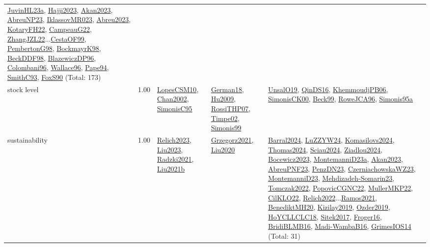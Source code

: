 {\begin{longtable}{p{3cm}r>{\raggedright\arraybackslash}p{6cm}>{\raggedright\arraybackslash}p{6cm}>{\raggedright\arraybackslash}p{8cm}}
\hyperref[detail:JuvinHL23a]{JuvinHL23a}, \hyperref[detail:Hajji2023]{Hajji2023}, \hyperref[detail:Akan2023]{Akan2023}, \hyperref[detail:AbreuNP23]{AbreuNP23}, \hyperref[detail:IklassovMR023]{IklassovMR023}, \hyperref[detail:Abreu2023]{Abreu2023}, \hyperref[detail:KotaryFH22]{KotaryFH22}, \hyperref[detail:CampeauG22]{CampeauG22}, \hyperref[detail:ZhangJZL22]{ZhangJZL22}...\hyperref[detail:CestaOF99]{CestaOF99}, \hyperref[detail:PembertonG98]{PembertonG98}, \hyperref[detail:BockmayrK98]{BockmayrK98}, \hyperref[detail:BeckDDF98]{BeckDDF98}, \hyperref[detail:BlazewiczDP96]{BlazewiczDP96}, \hyperref[detail:Colombani96]{Colombani96}, \hyperref[detail:Wallace96]{Wallace96}, \hyperref[detail:Pape94]{Pape94}, \hyperref[detail:SmithC93]{SmithC93}, \hyperref[detail:FoxS90]{FoxS90} (Total: 173)\\
\index{stock level}\index{Concepts!stock level}stock level &  1.00 & \hyperref[detail:LopesCSM10]{LopesCSM10}, \hyperref[detail:Chan2002]{Chan2002}, \hyperref[detail:SimonisC95]{SimonisC95} & \hyperref[detail:German18]{German18}, \hyperref[detail:Hu2009]{Hu2009}, \hyperref[detail:RossiTHP07]{RossiTHP07}, \hyperref[detail:Timpe02]{Timpe02}, \hyperref[detail:Simonis99]{Simonis99} & \hyperref[detail:UnsalO19]{UnsalO19}, \hyperref[detail:QinDS16]{QinDS16}, \hyperref[detail:KhemmoudjPB06]{KhemmoudjPB06}, \hyperref[detail:SimonisCK00]{SimonisCK00}, \hyperref[detail:Beck99]{Beck99}, \hyperref[detail:RoweJCA96]{RoweJCA96}, \hyperref[detail:Simonis95a]{Simonis95a}\\
\index{sustainability}\index{Concepts!sustainability}sustainability &  1.00 & \hyperref[detail:Relich2023]{Relich2023}, \hyperref[detail:Liu2023]{Liu2023}, \hyperref[detail:Radzki2021]{Radzki2021}, \hyperref[detail:Liu2021b]{Liu2021b} & \hyperref[detail:Grzegorz2021]{Grzegorz2021}, \hyperref[detail:Liu2020]{Liu2020} & \hyperref[detail:Barral2024]{Barral2024}, \hyperref[detail:LuZZYW24]{LuZZYW24}, \hyperref[detail:Komasilovs2024]{Komasilovs2024}, \hyperref[detail:Thomas2024]{Thomas2024}, \hyperref[detail:Sciau2024]{Sciau2024}, \hyperref[detail:Ziadlou2024]{Ziadlou2024}, \hyperref[detail:Bocewicz2023]{Bocewicz2023}, \hyperref[detail:MontemanniD23a]{MontemanniD23a}, \hyperref[detail:Akan2023]{Akan2023}, \hyperref[detail:AbreuPNF23]{AbreuPNF23}, \hyperref[detail:PenzDN23]{PenzDN23}, \hyperref[detail:CzerniachowskaWZ23]{CzerniachowskaWZ23}, \hyperref[detail:MontemanniD23]{MontemanniD23}, \hyperref[detail:Mehdizadeh-Somarin23]{Mehdizadeh-Somarin23}, \hyperref[detail:Tomczak2022]{Tomczak2022}, \hyperref[detail:PopovicCGNC22]{PopovicCGNC22}, \hyperref[detail:MullerMKP22]{MullerMKP22}, \hyperref[detail:CilKLO22]{CilKLO22}, \hyperref[detail:Relich2022]{Relich2022}...\hyperref[detail:Ramos2021]{Ramos2021}, \hyperref[detail:BenediktMH20]{BenediktMH20}, \hyperref[detail:Kizilay2019]{Kizilay2019}, \hyperref[detail:Ozder2019]{Ozder2019}, \hyperref[detail:HoYCLLCLC18]{HoYCLLCLC18}, \hyperref[detail:Sitek2017]{Sitek2017}, \hyperref[detail:Froger16]{Froger16}, \hyperref[detail:BridiBLMB16]{BridiBLMB16}, \hyperref[detail:Madi-WambaB16]{Madi-WambaB16}, \hyperref[detail:GrimesIOS14]{GrimesIOS14} (Total: 31)\\

\end{longtable}}
